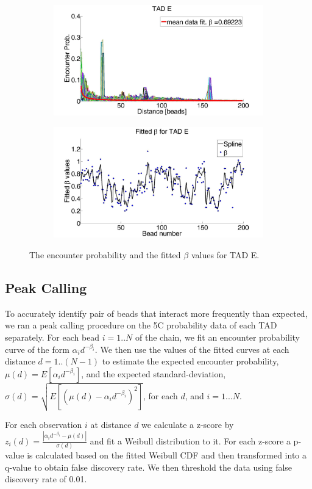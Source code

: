 \documentclass[12pt]{article}
\begin{document}
\begin{figure}[H]
 \begin{subfigure}[b]{0.3\textwidth}
 \includegraphics[scale=0.2]{meanDataFitTADE}
 \caption{}
 \end{subfigure}
 
 \begin{subfigure}[b]{0.3\textwidth}
\includegraphics[scale=0.2]{fittedExpValuesWithSplineAverageTADE}
\caption{}
 \end{subfigure}
\caption{The encounter probability and the fitted $\beta$ values for TAD E.}
\end{figure}
\subsection{Peak Calling}
To accurately identify pair of beads that interact more frequently than expected, we ran a peak calling procedure on the 5C probability data of each TAD separately. For each bead $i=1..N$ of the chain, we fit an encounter probability curve of the form 
$\alpha_i d^{-\beta_i}$. We then use the values of the fitted curves at each distance $d=1..(N-1)$  to estimate the expected encounter probability, $\mu(d) = E[\alpha_i d^{-\beta_i}]$, and the expected standard-deviation, $\sigma(d)=\sqrt{E[(\mu(d)-\alpha_i d^{-\beta_i})^2]}$, for each $d$, and $i=1...N$. 

For each observation $i$ at distance $d$ we calculate a z-score by $z_i(d)=\frac{|\alpha_i d^{-\beta_i}-\mu(d)|}{\sigma(d)}$ and fit a Weibull distribution to it. For each z-score a p-value is calculated based on the fitted Weibull CDF and then transformed into a q-value to obtain false discovery rate. We then threshold the data using false discovery rate of 0.01.
\end{document}
